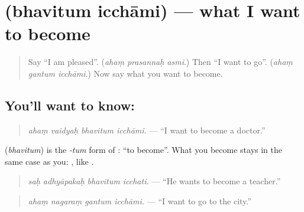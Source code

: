 \section[\texorpdfstring{\sk{भवितुम्} \sk{इच्छामि} (bhavitum icchāmi)}{भवितुम् इच्छामि (bhavitum icchāmi)}]{  (bhavitum icchāmi) — what I want to become}

\label{lesson:SA-C282-bhavitum-icchami}



\begin{quote}
Say \textquotedblleft{}I am pleased\textquotedblright{}. (\emph{ahaṃ prasannaḥ asmi}.) Then \textquotedblleft{}I want to go\textquotedblright{}. (\emph{ahaṃ gantum icchāmi}.) Now say what you want to become.
\end{quote}

\subsection*{You'll want to know:  }
\begin{quote}
\textbf{   }
\end{quote}

\begin{quote}
\emph{ahaṃ vaidyaḥ bhavitum icchāmi.} — \textquotedblleft{}I want to become a doctor.\textquotedblright{}
\end{quote}

\textbf{} (\emph{bhavitum}) is the \emph{-tum} form of \textbf{}: \textquotedblleft{}to become\textquotedblright{}. What you become stays in the same case as you: \textbf{}, like \textbf{}.

\begin{quote}
\textbf{   }
\end{quote}

\begin{quote}
\emph{saḥ adhyāpakaḥ bhavitum icchati.} — \textquotedblleft{}He wants to become a teacher.\textquotedblright{}
\end{quote}

\begin{quote}
\textbf{   }
\end{quote}

\begin{quote}
\emph{ahaṃ nagaraṃ gantum icchāmi.} — \textquotedblleft{}I want to go to the city.\textquotedblright{}
\end{quote}

